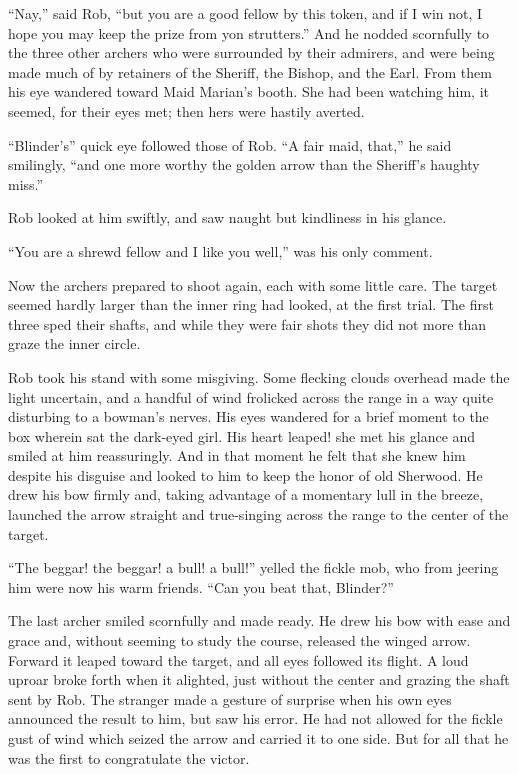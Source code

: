 ``Nay,'' said Rob, ``but you are a good fellow by this token, and if I
win not, I hope you may keep the prize from yon strutters.'' And he
nodded scornfully to the three other archers who were surrounded by
their admirers, and were being made much of by retainers of the Sheriff,
the Bishop, and the Earl. From them his eye wandered toward Maid
Marian's booth. She had been watching him, it seemed, for their eyes
met; then hers were hastily averted.

``Blinder's'' quick eye followed those of Rob. ``A fair maid, that,'' he
said smilingly, ``and one more worthy the golden arrow than the
Sheriff's haughty miss.''

Rob looked at him swiftly, and saw naught but kindliness in his glance.

``You are a shrewd fellow and I like you well,'' was his only comment.

Now the archers prepared to shoot again, each with some little care. The
target seemed hardly larger than the inner ring had looked, at the first
trial. The first three sped their shafts, and while they were fair shots
they did not more than graze the inner circle.

Rob took his stand with some misgiving. Some flecking clouds overhead
made the light uncertain, and a handful of wind frolicked across the
range in a way quite disturbing to a bowman's nerves. His eyes wandered
for a brief moment to the box wherein sat the dark-eyed girl. His heart
leaped! she met his glance and smiled at him reassuringly. And in that
moment he felt that she knew him despite his disguise and looked to him
to keep the honor of old Sherwood. He drew his bow firmly and, taking
advantage of a momentary lull in the breeze, launched the arrow straight
and true-singing across the range to the center of the target.

``The beggar! the beggar! a bull! a bull!'' yelled the fickle mob, who
from jeering him were now his warm friends. ``Can you beat that,
Blinder?''

The last archer smiled scornfully and made ready. He drew his bow with
ease and grace and, without seeming to study the course, released the
winged arrow. Forward it leaped toward the target, and all eyes followed
its flight. A loud uproar broke forth when it alighted, just without the
center and grazing the shaft sent by Rob. The stranger made a gesture of
surprise when his own eyes announced the result to him, but saw his
error. He had not allowed for the fickle gust of wind which seized the
arrow and carried it to one side. But for all that he was the first to
congratulate the victor.

